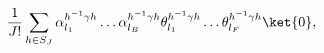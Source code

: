\begin{equation}
  \frac{1}{J!}\sum_{h\in S_J}\alpha^{h^{-1}\gamma h}_{l_1}\dots
  \alpha^{h^{-1}\gamma h}_{l_B}\theta^{h^{-1}\gamma h}_{l_1}\dots
  \theta^{h^{-1}\gamma h}_{l_F}\ket{0},
\end{equation}


